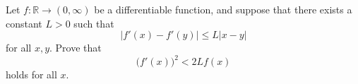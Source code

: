 \documentclass{article}
\begin{document}
\setlength{\parindent}{0pt}
Let $f\colon\mathbb{R}\to(0,\infty)$ be a differentiable function, and suppose that there exists a constant $L>0$ such that 
$$
\bigl|f'(x)-f'(y)\bigr| \leq L\bigl|x-y\bigr|
$$
for all $x,y$.
Prove that 
$$ \big(f'(x)\big)^2<2Lf(x) $$
holds for all $x$.
\end{document}
